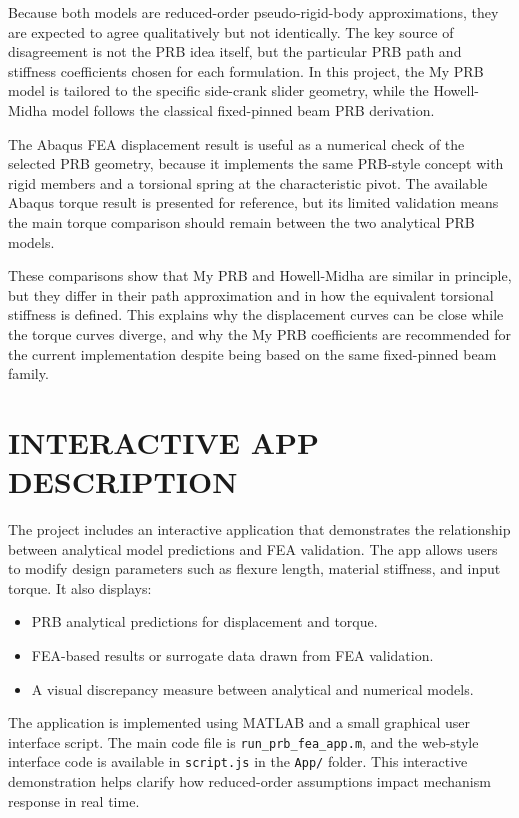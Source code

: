 \documentclass[colorlinks,upint,subscriptcorrection,varvw,hyphenate]{asmeconf}
\begin{document}
Because both models are reduced-order pseudo-rigid-body approximations, they are expected to agree qualitatively but not identically. The key source of disagreement is not the PRB idea itself, but the particular PRB path and stiffness coefficients chosen for each formulation. In this project, the My PRB model is tailored to the specific side-crank slider geometry, while the Howell-Midha model follows the classical fixed-pinned beam PRB derivation.

The Abaqus FEA displacement result is useful as a numerical check of the selected PRB geometry, because it implements the same PRB-style concept with rigid members and a torsional spring at the characteristic pivot. The available Abaqus torque result is presented for reference, but its limited validation means the main torque comparison should remain between the two analytical PRB models.

These comparisons show that My PRB and Howell-Midha are similar in principle, but they differ in their path approximation and in how the equivalent torsional stiffness is defined. This explains why the displacement curves can be close while the torque curves diverge, and why the My PRB coefficients are recommended for the current implementation despite being based on the same fixed-pinned beam family.

\section{INTERACTIVE APP DESCRIPTION}
The project includes an interactive application that demonstrates the relationship between analytical model predictions and FEA validation. The app allows users to modify design parameters such as flexure length, material stiffness, and input torque. It also displays:
\begin{itemize}
    \item PRB analytical predictions for displacement and torque.
    \item FEA-based results or surrogate data drawn from FEA validation.
    \item A visual discrepancy measure between analytical and numerical models.
\end{itemize}

The application is implemented using MATLAB and a small graphical user interface script. The main code file is \texttt{run\_prb\_fea\_app.m}, and the web-style interface code is available in \texttt{script.js} in the \texttt{App/} folder. This interactive demonstration helps clarify how reduced-order assumptions impact mechanism response in real time.
\end{document}
